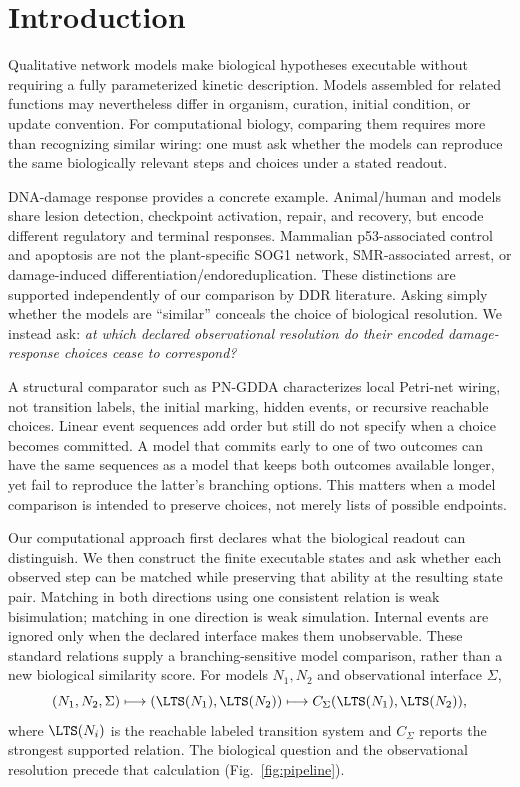 \section{Introduction}\label{sec:introduction}

Qualitative network models make biological hypotheses executable without
requiring a fully parameterized kinetic description. Models assembled for
related functions may nevertheless differ in organism, curation, initial
condition, or update convention. For computational biology, comparing them
requires more than recognizing similar wiring: one must ask whether the models
can reproduce the same biologically relevant steps and choices under a stated
readout.\cite{ChaouiyaPetriBio2007,Li2006,Fisher2007}

DNA-damage response provides a concrete example. Animal/human and
\tas{} models share lesion detection, checkpoint activation, repair, and
recovery, but encode different regulatory and terminal responses. Mammalian
p53-associated control and apoptosis are not the plant-specific SOG1 network,
SMR-associated arrest, or damage-induced differentiation/endoreduplication.
These distinctions are supported independently of our comparison by DDR
literature.\cite{JacksonBartek2009,BlackfordJackson2017,Yoshiyama2013,
DeSchutter2007,Yi2014,Adachi2011} Asking simply whether the models are
``similar'' conceals the choice of biological resolution. We instead ask:
\emph{at which declared observational resolution do their encoded
damage-response choices cease to correspond?}

A structural comparator such as PN-GDDA characterizes local Petri-net wiring,
not transition labels, the initial marking, hidden events, or recursive
reachable choices.\cite{Szawulak2022} Linear event sequences add order but
still do not specify when a choice becomes committed. A model that commits
early to one of two outcomes can have the same sequences as a model that keeps
both outcomes available longer, yet fail to reproduce the latter's branching
options. This matters when a model comparison is intended to preserve choices,
not merely lists of possible endpoints.

Our computational approach first declares what the biological readout can
distinguish. We then construct the finite executable states and ask whether
each observed step can be matched while preserving that ability at the
resulting state pair. Matching in both directions using one consistent relation
is weak bisimulation; matching in one direction is weak simulation. Internal
events are ignored only when the declared interface makes them unobservable.
These standard relations\cite{Milner1989,Sangiorgi2011} supply a
branching-sensitive model comparison, rather than a new biological similarity
score. For models $N_1,N_2$ and observational interface $\Sigma$,
\begin{equation}\label{eq:comparison-map}
 (N_1,N_2,\Sigma)\longmapsto(\LTS(N_1),\LTS(N_2))
 \longmapsto C_\Sigma(\LTS(N_1),\LTS(N_2)),
\end{equation}
where $\LTS(N_i)$ is the reachable labeled transition system and $C_\Sigma$
reports the strongest supported relation. The biological question and the
observational resolution precede that calculation (Fig.~\ref{fig:pipeline}).


